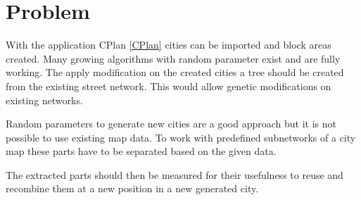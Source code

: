 \chapter{Problem}
With the application CPlan \ref{CPlan} cities can be imported and block areas created. Many growing algorithms with random parameter exist and are fully working. The apply modification on the created cities a tree should be created from the existing street network. This would allow genetic modifications on existing networks.

Random parameters to generate new cities are a good approach but it is not possible to use existing map data. To work with predefined subnetworks of a city map these parts have to be separated based on the given data.

The extracted parts should then be measured for their usefulness to reuse and recombine them at a new position in a new generated city.
